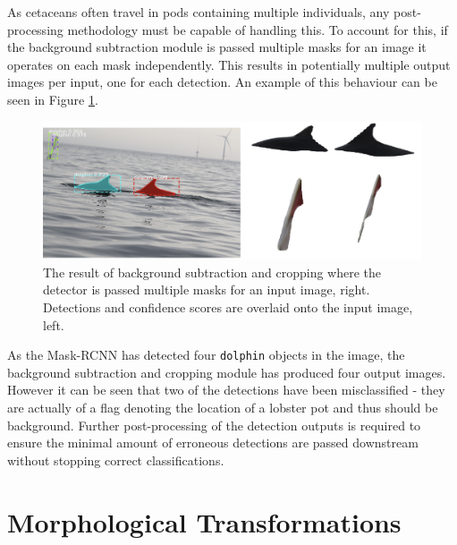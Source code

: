 As cetaceans often travel in pods containing multiple individuals, any post-processing methodology must be capable of handling this. To account for this, if the background subtraction module is passed multiple masks for an image it operates on each mask independently. This results in potentially multiple output images per input, one for each detection. An example of this behaviour can be seen in Figure \ref{fig:fin-extraction-pod-with-flag}.

\begin{figure}[h]
	\begin{center}
		\includegraphics[scale=0.5]{Chapter4/figs/fin-extraction-pod-with-flag.png}
	\end{center}
	\caption{The result of background subtraction and cropping where the detector is passed multiple masks for an input image, right. Detections and confidence scores are overlaid onto the input image, left.}
	\label{fig:fin-extraction-pod-with-flag}
\end{figure}

As the Mask-RCNN has detected four \texttt{dolphin} objects in the image, the background subtraction and cropping module has produced four output images. However it can be seen that two of the detections have been misclassified - they are actually of a flag denoting the location of a lobster pot and thus should be background. Further post-processing of the detection outputs is required to ensure the minimal amount of erroneous detections are passed downstream without stopping correct classifications. 

\section{Morphological Transformations}\label{ch:postProcessing,sec:morphologicalTransformations}




